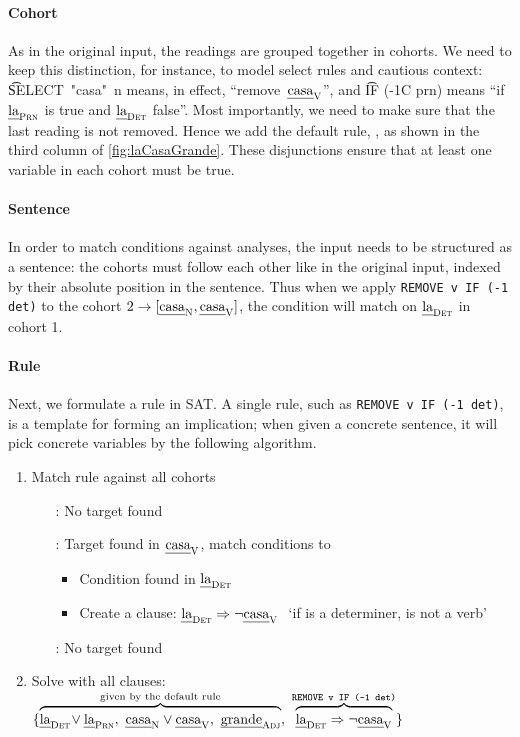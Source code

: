 \paragraph{Cohort} As in the original input, the readings are grouped together in cohorts. We need to keep this distinction, for instance, to model {\sc select} rules and cautious context: 
\t{SELECT~"casa"~n} means, in effect, ``remove~$\text{\em casa}_{\text{\sc V}}$'', and \t{IF (-1C prn)} means ``if $\text{\em la}_{\text{\sc Prn}}$ is true and $\text{\em la}_{\text{\sc Det}}$ false''. 
%
Most importantly, we need to make sure that the last reading is not removed. Hence we add the default rule, , as shown in the third column of \ref{fig:laCasaGrande}. 
These disjunctions ensure that at least one variable in each cohort must be true.



\paragraph{Sentence}
In order to match conditions against analyses, the input needs to be structured as a sentence: the cohorts must follow each other like in the original input, indexed by their absolute position in the sentence. Thus when we apply \texttt{REMOVE v IF (-1 det)} to the cohort $2 \rightarrow [\text{\em casa}_{\text{\sc N}} , \text{\em casa}_{\text{\sc V}}]$, the condition will match on $\text{\em la}_{\text{\sc Det}}$ in cohort 1.


\paragraph{Rule}

Next, we formulate a rule in SAT. A single rule, such as \texttt{REMOVE v IF (-1 det)}, is a template for forming an implication; when given a concrete sentence, it will pick concrete variables by the following algorithm.

\begin{enumerate}
\item Match rule against all cohorts
 \begin{itemize}
    \item[\la:] No target found
    \item[\casa:] Target found in $\text{\em casa}_{\text{\sc V}}$, match conditions to \la
      \begin{itemize}
       \item Condition found in $\text{\em la}_{\text{\sc Det}}$
       \item Create a clause: $\text{\em la}_{\text{\sc Det}} \Rightarrow \neg \text{\em casa}_{\text{\sc V}} \ $ `if \la{} is a determiner, \casa{} is not a verb'
      \end{itemize}
    \item[\grande:] No target found
  \end{itemize}
\item Solve with all clauses: 
  $\{ \ob{\laDet \! \vee \laPrn, \ \casaN \vee \casaV, \  \grandeAdj}^{\text{given by the default rule}}, \ 
      \ob{\laDet \Rightarrow \neg \casaV}^{\t{REMOVE v IF (-1 det)}} \}$
\end{enumerate}

